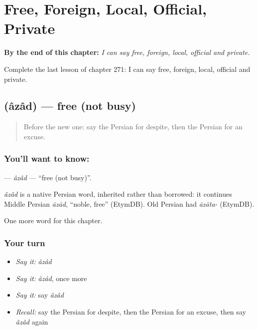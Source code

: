 
\chapter{Free, Foreign, Local, Official, Private}
\label{ch:fa-free-foreign-local-official-private}

\begin{chapteropening}
\textbf{By the end of this chapter:} \emph{I can say free, foreign, local, official and private.}

Complete the last lesson of chapter 271: I can say free, foreign, local, official and private.
\end{chapteropening}

\section[\texorpdfstring{\fa{آزاد} (âzâd)}{آزاد (âzâd)}]{ (âzâd) — free (not busy)}

\label{lesson:FA-C271-azad}



\begin{quote}
Before the new one: say the Persian for despite, then the Persian for an excuse.
\end{quote}

\subsection*{You'll want to know: }
\textbf{} — \emph{âzâd} — \textquotedblleft{}free (not busy)\textquotedblright{}.

\begin{cousinweb}
\emph{âzâd} is a native Persian word, inherited rather than borrowed: it continues Middle Persian \emph{āzād}, \textquotedblleft{}noble, free\textquotedblright{} (EtymDB). Old Persian had \emph{āzāta-} (EtymDB).
\end{cousinweb}

\begin{grammarlens}[title={What you've built}]
One more word for this chapter.
\end{grammarlens}

\subsection*{Your turn}
\begin{itemize}
\raggedright
  \item \emph{Say it:} \emph{âzâd}
  \item \emph{Say it:} \emph{âzâd}, once more
  \item \emph{Say it:} say \emph{âzâd}
  \item \emph{Recall:} say the Persian for despite, then the Persian for an excuse, then say \emph{âzâd} again
\end{itemize}

